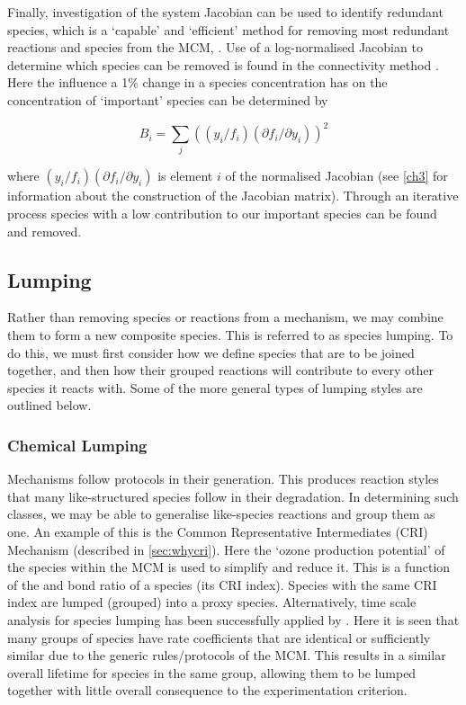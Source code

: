 Finally, investigation of the system Jacobian can be used to identify redundant species, which is a `capable' and `efficient' method for removing most redundant reactions and species from the MCM, \citep{QSSA}. Use of a log-normalised Jacobian to determine which species can be removed is found in the connectivity method \citep{connectivity,cm}.
Here the influence a 1\%  change in a species concentration has on the concentration of `important' species can be determined by

\begin{equation}
B_i  = \sum_j(({y_i}/{f_i})({\partial f_i}/{\partial y_i}))^2 \label{connectivity}
\end{equation}

 where $({y_i}/{f_i})({\partial f_i}/{\partial y_i})$ is element $i$ of the normalised Jacobian (see \autoref{ch3} for information about the construction of the Jacobian matrix). Through an iterative process species with a low contribution to our important species can be found and removed.


\subsection{Lumping}

Rather than removing species or reactions from a mechanism, we may combine them to form a new composite species. This is referred to as species lumping. To do this, we must first consider how we define species that are to be joined together, and then how their grouped reactions will contribute to every other species it reacts with. Some of the more general types of lumping styles are outlined below.


\subsubsection{Chemical Lumping}\label{sec:chemlump}
Mechanisms follow protocols in their generation. This produces reaction styles that many like-structured species follow in their degradation. In determining such classes, we may be able to generalise like-species reactions and group them as one.
An example of this is the Common Representative Intermediates (CRI) Mechanism (described in \autoref{sec:whycri}).  Here the `ozone production potential' of the species within the MCM is used to simplify and reduce it. This is a function of the  and  bond ratio of a species (its CRI index). Species with the same CRI index are lumped (grouped) into a proxy species. Alternatively, time scale analysis for species lumping has been successfully applied by  \citep{lifetime}. Here it is seen that many groups of species have rate coefficients that are identical or sufficiently similar due to the generic rules/protocols of the MCM. This results in a similar overall lifetime for species in the same group, allowing them to be lumped together with little overall consequence to the experimentation criterion.


